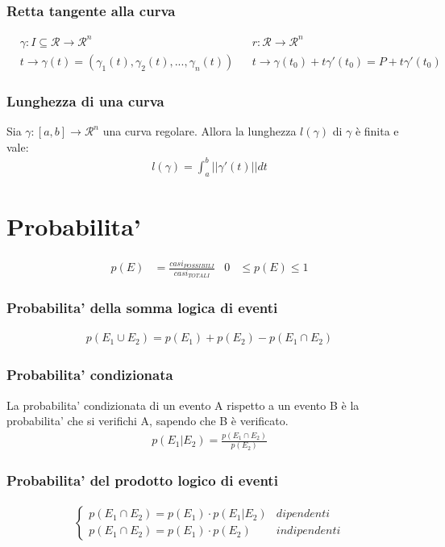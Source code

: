 \documentclass[a4paper]{article}
\begin{document}
	\subsubsection{Retta tangente alla curva}
	\begin{align*}
		&\gamma: I \subseteq \mathcal{R} \to \mathcal{R}^n	&	&r: \mathcal{R} \to \mathcal{R}^n\\
		&t \to \gamma (t) = (\gamma_1 (t),\gamma_2 (t),...,\gamma_n (t))	&	&t \to \gamma (t_0) + t\gamma' (t_0) = P + t\gamma' (t_0)
	\end{align*}
	\subsubsection{Lunghezza di una curva}
	Sia $\gamma : [a,b] \to \mathcal{R}^n$ una curva regolare. Allora la lunghezza $l(\gamma)$ di $\gamma$ è finita e vale:
	\begin{align*}
		l(\gamma) = \int_{a}^{b} || \gamma'(t) ||dt
	\end{align*}
	
	\newpage
	\section{Probabilita'}
	\begin{align*}
		p(E) & = \frac{casi_{POSSIBILI}}{casi_{TOTALI}} & 0 & \le p(E) \le 1
	\end{align*}
	
	\subsubsection{Probabilita' della somma logica di eventi}
	\begin{align*}
		p(E_1 \cup E_2) = p(E_1) + p(E_2) - p(E_1 \cap E_2)
	\end{align*}
	
	\subsubsection{Probabilita' condizionata}
	La probabilita' condizionata di un evento A rispetto a un evento B è la probabilita' che si verifichi A, sapendo che B è verificato.
	\begin{align*}
		p(E_1 | E_2) = \frac{p(E_1 \cap E_2)}{p(E_2)}
	\end{align*}
	
	\subsubsection{Probabilita' del prodotto logico di eventi}
	\begin{align*}
		\begin{cases}
		p(E_1 \cap E_2) = p(E_1) \cdot p(E_1 | E_2)	& dipendenti\\
		p(E_1 \cap E_2) = p(E_1) \cdot p(E_2)		& indipendenti
		\end{cases}
	\end{align*}
	
\end{document}
